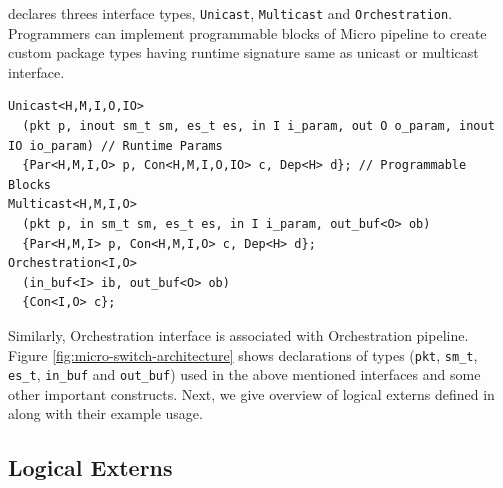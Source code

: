 \documentclass[letterpaper,twocolumn,10pt]{article}
\begin{document}
\uarch declares threes interface types, \texttt{Unicast}, \texttt{Multicast} and \texttt{Orchestration}.
Programmers can implement programmable blocks of Micro pipeline to create custom package types having runtime signature same as unicast or multicast interface.
\begin{lstlisting}[frame=none]
Unicast<H,M,I,O,IO>
  (pkt p, inout sm_t sm, es_t es, in I i_param, out O o_param, inout IO io_param) // Runtime Params
  {Par<H,M,I,O> p, Con<H,M,I,O,IO> c, Dep<H> d}; // Programmable Blocks
Multicast<H,M,I,O>
  (pkt p, in sm_t sm, es_t es, in I i_param, out_buf<O> ob)
  {Par<H,M,I> p, Con<H,M,I,O> c, Dep<H> d}; 
Orchestration<I,O>
  (in_buf<I> ib, out_buf<O> ob)
  {Con<I,O> c};
\end{lstlisting}
Similarly, Orchestration interface is associated with Orchestration pipeline.
Figure \ref{fig:micro-switch-architecture} shows declarations of types (\texttt{pkt}, \texttt{sm\_t}, \texttt{es\_t}, \texttt{in\_buf} and \texttt{out\_buf}) used in the above mentioned interfaces and some other important constructs.
Next, we give overview of logical externs defined in \uarch along with their example usage.




\subsection{Logical Externs}
\label{sec:logical-externs}
\end{document}
